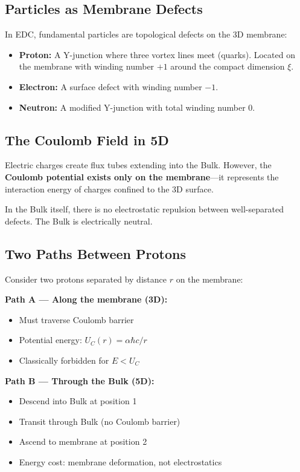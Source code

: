 \documentclass[12pt,a4paper]{article}
\begin{document}
\subsection{Particles as Membrane Defects}

In EDC, fundamental particles are topological defects on the 3D membrane:

\begin{itemize}
    \item \textbf{Proton:} A Y-junction where three vortex lines meet (quarks). Located on the membrane with winding number $+1$ around the compact dimension $\xi$.
    \item \textbf{Electron:} A surface defect with winding number $-1$.
    \item \textbf{Neutron:} A modified Y-junction with total winding number $0$.
\end{itemize}

\subsection{The Coulomb Field in 5D}

Electric charges create flux tubes extending into the Bulk. However, the \textbf{Coulomb potential exists only on the membrane}---it represents the interaction energy of charges confined to the 3D surface.

In the Bulk itself, there is no electrostatic repulsion between well-separated defects. The Bulk is electrically neutral.

\subsection{Two Paths Between Protons}

Consider two protons separated by distance $r$ on the membrane:

\textbf{Path A --- Along the membrane (3D):}
\begin{itemize}
    \item Must traverse Coulomb barrier
    \item Potential energy: $U_C(r) = \alpha\hbar c/r$
    \item Classically forbidden for $E < U_C$
\end{itemize}

\textbf{Path B --- Through the Bulk (5D):}
\begin{itemize}
    \item Descend into Bulk at position 1
    \item Transit through Bulk (no Coulomb barrier)
    \item Ascend to membrane at position 2
    \item Energy cost: membrane deformation, not electrostatics
\end{itemize}
\end{document}
